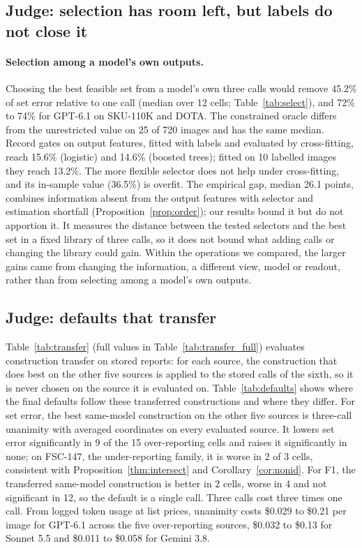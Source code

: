 \subsection{Judge: selection has room left, but labels do not close it}\label{sec:res:select}



\paragraph{Selection among a model's own outputs.} Choosing the best feasible set from a model's own three calls would remove 45.2\% of set error relative to one call (median over 12 cells; Table~\ref{tab:select}), and 72\% to 74\% for GPT-6.1 on SKU-110K and DOTA. The constrained oracle differs from the unrestricted value on 25 of 720 images and has the same median. Record gates on output features, fitted with labels and evaluated by cross-fitting, reach 15.6\% (logistic) and 14.6\% (boosted trees); fitted on 10 labelled images they reach 13.2\%. The more flexible selector does not help under cross-fitting, and its in-sample value (36.5\%) is overfit. The empirical gap, median 26.1 points, combines information absent from the output features with selector and estimation shortfall (Proposition~\ref{prop:order}); our results bound it but do not apportion it. It measures the distance between the tested selectors and the best set in a fixed library of three calls, so it does not bound what adding calls or changing the library could gain. Within the operations we compared, the larger gains came from changing the information, a different view, model or readout, rather than from selecting among a model's own outputs.

\subsection{Judge: defaults that transfer}\label{sec:res:transfer}



Table~\ref{tab:transfer} (full values in Table~\ref{tab:transfer_full}) evaluates construction transfer on stored reports: for each source, the construction that does best on the other five sources is applied to the stored calls of the sixth, so it is never chosen on the source it is evaluated on. Table~\ref{tab:defaults} shows where the final defaults follow these transferred constructions and where they differ. For set error, the best same-model construction on the other five sources is three-call unanimity with averaged coordinates on every evaluated source. It lowers set error significantly in 9 of the 15 over-reporting cells and raises it significantly in none; on FSC-147, the under-reporting family, it is worse in 2 of 3 cells, consistent with Proposition~\ref{thm:intersect} and Corollary~\ref{cor:nonid}. For F1, the transferred same-model construction is better in 2 cells, worse in 4 and not significant in 12, so the default is a single call. Three calls cost three times one call. From logged token usage at list prices, unanimity costs \$0.029 to \$0.21 per image for GPT-6.1 across the five over-reporting sources, \$0.032 to \$0.13 for Sonnet 5.5 and \$0.011 to \$0.058 for Gemini 3.8.

